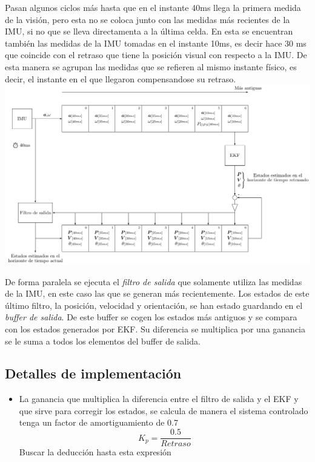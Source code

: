 Pasan algunos ciclos más hasta que en el instante 40ms llega la primera medida de la visión, pero esta no se coloca junto con las medidas más recientes de la IMU, si no que se lleva directamenta a la última celda. En esta se encuentran también las medidas de la IMU tomadas en el instante 10ms, es decir hace 30 ms que coincide con el retraso que tiene la posición visual con respecto a la IMU. De esta manera se agrupan las medidas que se refieren al mismo instante físico, es decir, el instante en el que llegaron compensandose su retraso. 
\\
\includegraphics[width=\textwidth]{estimador_px4/tikz/ekf_output}



De forma paralela se ejecuta el \textit{filtro de salida} que solamente utiliza las medidas de la IMU, en este caso las que se generan más recientemente.
Los estados de este último filtro, la posición, velocidad y orientación,  se han estado guardando en el \textit{buffer de salida}.  
De este buffer se cogen los estados más antiguos y se compara con los estados generados por EKF. Su diferencia se multiplica por una ganancia se le suma a todos los elementos del buffer de salida.  

\subsection{Detalles de implementación}
\begin{itemize}
\item La ganancia que multiplica la diferencia entre el filtro de salida y el EKF y que sirve para corregir los estados, se calcula de manera el sistema controlado tenga un factor de amortiguamiento de 0.7
\begin{equation}
K_p=\frac{0.5}{Retraso}
\end{equation} 
{\color{red} Buscar la deducción hasta esta expresión}
\end{itemize}
